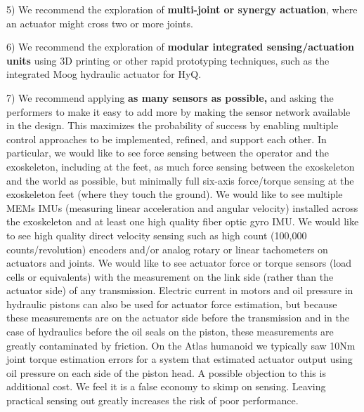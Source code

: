 \documentclass[letterpaper,12pt,fullpage]{article}
\begin{document}
5) We recommend the exploration of {\bf multi-joint or synergy actuation}, where an actuator
might cross two or more joints.

6) We recommend the exploration of {\bf modular integrated sensing/actuation units} using 3D printing
or other rapid prototyping techniques, such as the integrated Moog hydraulic
actuator for HyQ.

7) We recommend applying {\bf as many sensors as possible,} and asking the performers
to make it easy to add more by making the sensor network available in the design.
This maximizes the probability of success
by enabling multiple control
approaches to be implemented, refined, and support each other.
In particular, we would like to see force sensing between the operator and the
exoskeleton, including at the feet, as much force sensing between the exoskeleton 
and the world as possible, but minimally full six-axis force/torque sensing at
the exoskeleton feet (where they touch the ground). We would like to see multiple MEMs
IMUs (measuring linear acceleration and angular velocity) installed across 
the exoskeleton and at least one high quality fiber optic gyro IMU.
We would like to see high quality direct velocity sensing
such as high count (100,000 counts/revolution) encoders and/or 
analog rotary or linear tachometers on actuators and joints. 
We would like to see actuator force or torque sensors
(load cells or equivalents) with the measurement on the link side (rather than
the actuator side) of any transmission. Electric current in motors and oil
pressure in hydraulic pistons can also be used for actuator force estimation,
but because these measurements are on the actuator side before the transmission
and in the case of hydraulics before the oil seals on the piston, these measurements
are greatly contaminated by friction. On the Atlas humanoid we typically saw 10Nm
joint torque estimation errors for a system that estimated actuator output using
oil pressure on each side of the piston head.
A possible objection to this is additional cost. We feel it is a false
economy to skimp on sensing. Leaving practical sensing out greatly increases
the risk of poor performance.



\end{document}
